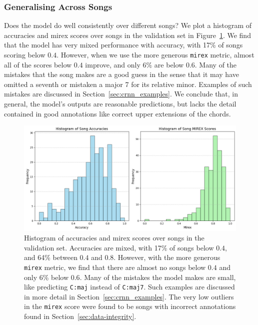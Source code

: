 \subsubsection{Generalising Across Songs}

Does the model do well consistently over different songs? We plot a histogram of accuracies and mirex scores over songs in the validation set in Figure~\ref{fig:crnn_song_hist}. We find that the model has very mixed performance with accuracy, with 17\% of songs scoring below $0.4$. However, when we use the more generous \texttt{mirex} metric, almost all of the scores below $0.4$ improve, and only $6\%$ are below $0.6$. Many of the mistakes that the song makes are a good guess in the sense that it may have omitted a seventh or mistaken a major 7 for its relative minor. Examples of such mistakes are discussed in Section~\ref{sec:crnn_examples}. We conclude that, in general, the model's outputs are reasonable predictions, but lacks the detail contained in good annotations like correct upper extensions of the chords.

\begin{figure}[H]
    \centering
    \includegraphics[width=1.0\textwidth]{figures/accuracy_mirex_histograms.png}
    \caption{Histogram of accuracies and mirex scores over songs in the validation set. Accuracies are mixed, with 17\% of songs below $0.4$, and 64\% between $0.4$ and $0.8$. However, with the more generous \texttt{mirex} metric, we find that there are almost no songs below $0.4$ and only 6\% below $0.6$. Many of the mistakes the model makes are small, like predicting \texttt{C:maj} instead of \texttt{C:maj7}. Such examples are discussed in more detail in Section~\ref{sec:crnn_examples}. The very low outliers in the \texttt{mirex} score were found to be songs with incorrect annotations found in Section~\ref{sec:data-integrity}.}\label{fig:crnn_song_hist}
\end{figure}

